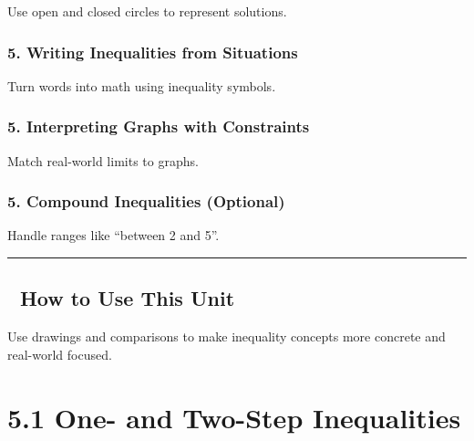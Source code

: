 \documentclass[
  letterpaper,
  DIV=11,
  numbers=noendperiod]{scrreprt}
\begin{document}
Use open and closed circles to represent solutions.

\subsection*{5. Writing Inequalities from
Situations}\label{writing-inequalities-from-situations}

Turn words into math using inequality symbols.

\subsection*{5. Interpreting Graphs with
Constraints}\label{interpreting-graphs-with-constraints}

Match real-world limits to graphs.

\subsection*{5. Compound Inequalities
(Optional)}\label{compound-inequalities-optional}

Handle ranges like ``between 2 and 5''.

\begin{center}\rule{0.5\linewidth}{0.5pt}\end{center}

\section*{🧭 How to Use This Unit}\label{how-to-use-this-unit-2}


Use drawings and comparisons to make inequality concepts more concrete
and real-world focused.

\chapter*{5.1 One- and Two-Step
Inequalities}\label{one--and-two-step-inequalities-1}

\end{document}
